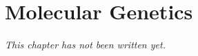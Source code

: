 \chapter{Molecular Genetics}\label{ch:b1:mol-genetics}


\emph{This chapter has not been written yet.}
